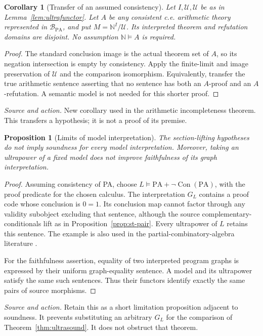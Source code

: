 \documentclass[11pt]{article}
\newtheorem{proposition}[theorem]{Proposition}
\newtheorem{corollary}[theorem]{Corollary}
\theoremstyle{definition}\newtheorem{definition}[theorem]{Definition}
\newcommand{\PA}{\mathrm{PA}}
\newcommand{\N}{\mathbb N}
\newcommand{\Con}{\operatorname{Con}}
\newcommand{\B}{\mathcal B}
\newcommand{\U}{\mathcal U}
\newcommand{\source}[1]{\par\smallskip\noindent\textit{Source and action.} #1\par\smallskip}
\begin{document}
\begin{corollary}[Transfer of an assumed consistency]\label{cor:consistency}
Let $I,\U,\mathscr U$ be as in Lemma~\ref{lem:ultrafunctor}.
Let $A$ be any consistent c.e. arithmetic theory represented in
$\B_{\PA}$, and put $M=\N^I/\U$. Its interpreted theorem and
refutation domains are disjoint. No assumption $\N\models A$
is required.
\end{corollary}
\begin{proof}
The standard conclusion image is the actual theorem set of $A$,
so its negation intersection is empty by consistency. Apply the
finite-limit and image preservation of $\mathscr U$ and the
comparison isomorphism. Equivalently, transfer the true arithmetic
sentence asserting that no sentence has both an $A$-proof and an
$A$-refutation. A semantic model is not needed for this shorter proof.
\end{proof}
\source{New corollary used in the arithmetic incompleteness theorem. This transfers a hypothesis; it is not a proof of its premise.}

\begin{proposition}[Limits of model interpretation]\label{prop:limits}
The section-lifting hypotheses do not imply soundness for every model
interpretation. Moreover, taking an ultrapower of a fixed model does
not improve faithfulness of its graph interpretation.
\end{proposition}
\begin{proof}
Assuming consistency of PA, choose
$L\models\PA+\neg\Con(\PA)$, with the proof predicate for the
chosen calculus. The interpretation $G_L$ contains a proof code whose
conclusion is $0=1$. Its conclusion map cannot factor through any
validity subobject excluding that sentence, although the source
complementary-conditionals lift as in Proposition~\ref{prop:st-pair}.
Every ultrapower of $L$ retains this sentence. The example is also
used in the partial-combinatory-algebra literature \cite[\S7]{Terwijn}.

For the faithfulness assertion, equality of two interpreted program
graphs is expressed by their uniform graph-equality sentence. A
model and its ultrapower satisfy the same such sentences. Thus
their functors identify exactly the same pairs of source morphisms.
\end{proof}
\source{Retain this as a short limitation proposition adjacent to soundness. It prevents substituting an arbitrary $G_L$ for the comparison of Theorem~\ref{thm:ultrasound}. It does not obstruct that theorem.}
\end{document}

